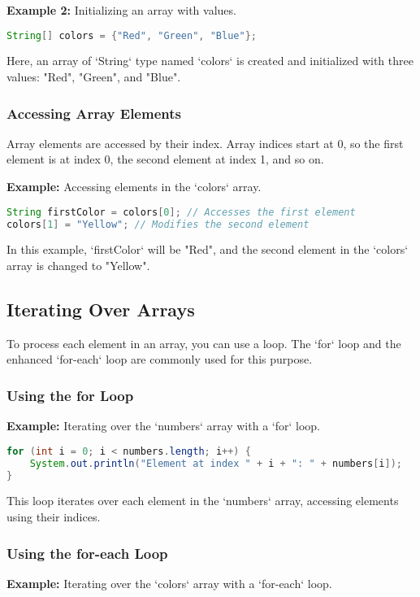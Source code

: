 \documentclass{article}
\begin{document}
\textbf{Example 2:} Initializing an array with values.

\begin{lstlisting}[language=Java]
String[] colors = {"Red", "Green", "Blue"};
\end{lstlisting}

Here, an array of `String` type named `colors` is created and initialized with three values: "Red", "Green", and "Blue".

\subsubsection{Accessing Array Elements}
Array elements are accessed by their index. Array indices start at 0, so the first element is at index 0, the second element at index 1, and so on.

\textbf{Example:} Accessing elements in the `colors` array.

\begin{lstlisting}[language=Java]
String firstColor = colors[0]; // Accesses the first element
colors[1] = "Yellow"; // Modifies the second element
\end{lstlisting}

In this example, `firstColor` will be "Red", and the second element in the `colors` array is changed to "Yellow".



\newpage
\subsection{Iterating Over Arrays}
To process each element in an array, you can use a loop. The `for` loop and the enhanced `for-each` loop are commonly used for this purpose.

\subsubsection{Using the for Loop}
\textbf{Example:} Iterating over the `numbers` array with a `for` loop.

\begin{lstlisting}[language=Java]
for (int i = 0; i < numbers.length; i++) {
    System.out.println("Element at index " + i + ": " + numbers[i]);
}
\end{lstlisting}

This loop iterates over each element in the `numbers` array, accessing elements using their indices.

\subsubsection{Using the for-each Loop}
\textbf{Example:} Iterating over the `colors` array with a `for-each` loop.
\end{document}
